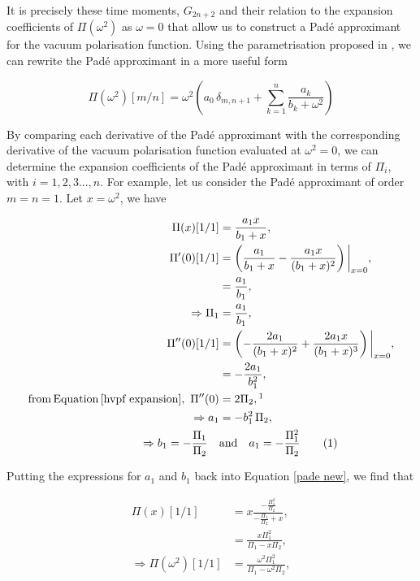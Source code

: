 \documentclass{article}
\numberwithin{equation}{section} %
\begin{document}
It is precisely these time moments, $G_{2n+2}$ and their relation to the expansion coefficients of $\Pi(\omega^2)$ as $\omega=0$ that allow us to construct a Pad\'e approximant for the vacuum polarisation function. Using the parametrisation proposed in \cite{pade2}, we can rewrite the Pad\'e approximant in a more useful form 

\begin{equation}
\Pi(\omega^2)[m/n] = \omega^2\left( a_0\,\delta_{m,n+1} + \sum_{k=1}^n \frac{a_k}{b_k + \omega^2} \right)
\label{pade new}
\end{equation}

By comparing each derivative of the Pad\'e approximant with the corresponding derivative of the vacuum polarisation function evaluated at $\omega^2=0$, we can determine the expansion coefficients of the Pad\'e approximant in terms of $\Pi_i$, with $i=1,2,3...,n$. For example, let us consider the Pad\'e approximant of order $m=n=1$. Let $x=\omega^2$, we have 

\begin{align*}
\Pi (x)[1/1] &= \frac{a_1x}{b_1+x},\\
\Pi '(0)[1/1]&= \left(\frac{a_1}{b_1+x} - \frac{a_1x}{(b_1+x)^2}\right)\bigg\vert_{x=0},\\
&= \frac{a_1}{b_1},\\
\Rightarrow \Pi_1 &= \frac{a_1}{b_1},\\
\Pi ''(0)[1/1]&= \left(-\frac{2a_1}{(b_1+x)^2} + \frac{2a_1x}{(b_1+x)^3}\right)\bigg\vert_{x=0},\\
&=-\frac{2a_1}{b_1^2},\\
\mathrm{from \, Equation \, \ref{hvpf expansion},\,}\,\,\Pi''(0) &= 2\Pi_2, \footnotemark\nonumber\\
\Rightarrow a_1 &= -b_1^2\,\Pi_2,\\
\Rightarrow b_1 = -\frac{\Pi_1}{\Pi_2} \quad &\mathrm{and} \quad a_1 = -\frac{\Pi_1^2}{\Pi_2}
\tag{\refstepcounter{equation}\theequation}
\end{align*}

\noindent Putting the expressions for $a_1$ and $b_1$ back into Equation \ref{pade new}, we find that

\begin{equation}
\begin{split}
\Pi(x)[1/1] &= x \frac{-\frac{\Pi_1^2}{\Pi_2}}{-\frac{\Pi_1}{\Pi_2}+x},\\
&= \frac{x\Pi_1^2}{\Pi_1-x\Pi_2},\\
\Rightarrow \Pi(\omega^2)[1/1]&= \frac{\omega^2\Pi_1^2}{\Pi_1-\omega^2\Pi_2},\\
\end{split}
\label{pade 11}
\end{equation}
\end{document}
